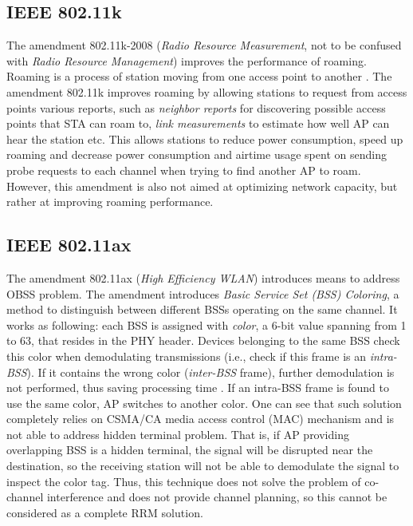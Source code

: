 
\subsection {IEEE 802.11k}
\label{chap:lr:sec:80211k}
The amendment 802.11k-2008 \cite{80211k} (\textit{Radio Resource Measurement}, not to be confused with \textit{Radio Resource Management}) improves the performance of roaming. Roaming is a process of station moving from one access point to another \cite{colemanCWNACertifiedWireless2021}. The amendment 802.11k improves roaming by allowing stations to request from access points various reports, such as \textit{neighbor reports} for discovering possible access points that STA can roam to, \textit{link measurements} to estimate how well AP can hear the station etc. This allows stations to reduce power consumption, speed up roaming and decrease power consumption and airtime usage spent on sending probe requests to each channel when trying to find another AP to roam.
However, this amendment is also not aimed at optimizing network capacity, but rather at improving roaming performance.

\subsection {IEEE 802.11ax}
\label{chap:lr:sec:80211ax}

The amendment 802.11ax \cite{80211ax} (\textit{High Efficiency WLAN}) introduces means to address OBSS problem. The amendment introduces \textit{Basic Service Set (BSS) Coloring}, a method to distinguish between different BSSs operating on the same channel. It works as following: each BSS is assigned with \textit{color}, a 6-bit value spanning from 1 to 63, that resides in the PHY header. Devices belonging to the same BSS check this color when demodulating transmissions (i.e., check if this frame is an \textit{intra-BSS}). If it contains the wrong color (\textit{inter-BSS} frame), further demodulation is not performed, thus saving processing time \cite{CiscoCatalyst9800}.
If an intra-BSS frame is found to use the same color, AP switches to another color.
One can see that such solution completely relies on CSMA/CA media access control (MAC) mechanism and is not able to address hidden terminal problem. That is, if AP providing overlapping BSS is a hidden terminal, the signal will be disrupted near the destination, so the receiving station will not be able to demodulate the signal to inspect the color tag.
Thus, this technique does not solve the problem of co-channel interference and does not provide channel planning, so this cannot be considered as a complete RRM solution.



